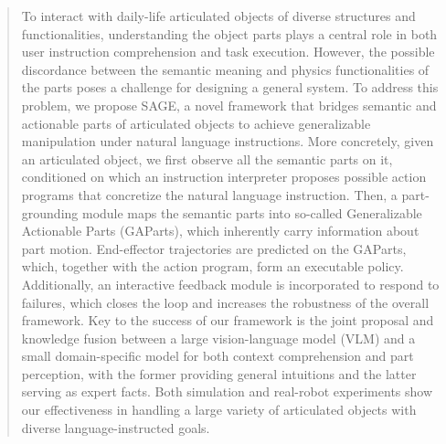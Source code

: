 \begin{abstract}

To interact with daily-life articulated objects of diverse structures and functionalities, understanding the object parts plays a central role in both user instruction comprehension and task execution.
However, the possible discordance between the semantic meaning and physics functionalities of the parts poses a challenge for designing a general system.
To address this problem, we propose SAGE, a novel framework that bridges semantic and actionable parts of articulated objects to achieve generalizable manipulation under natural language instructions.
%
More concretely, given an articulated object, we first observe all the semantic parts on it, conditioned on which an instruction interpreter proposes possible action programs that concretize the natural language instruction. Then, a part-grounding module maps the semantic parts into so-called Generalizable Actionable Parts (GAParts), which inherently carry information about part motion. End-effector trajectories are predicted on the GAParts, which, together with the action program, form an executable policy. Additionally, an interactive feedback module is incorporated to respond to failures, which closes the loop and increases the robustness of the overall framework.
%
Key to the success of our framework is the joint proposal and knowledge fusion between a large vision-language model (VLM) and a small domain-specific model for both context comprehension and part perception, with the former providing general intuitions and the latter serving as expert facts.
%
Both simulation and real-robot experiments show our effectiveness in handling a large variety of articulated objects with diverse language-instructed goals.

\end{abstract}